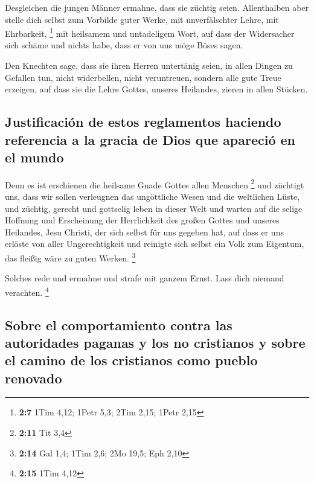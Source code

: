  Desgleichen die jungen Männer ermahne, dass sie züchtig
seien.  Allenthalben aber stelle dich selbst zum Vorbilde
guter Werke, mit unverfälschter Lehre, mit Ehrbarkeit, \footnote{\textbf{2:7}
  1Tim 4,12; 1Petr 5,3; 2Tim 2,15; 1Petr 2,15}  mit
heilsamem und untadeligem Wort, auf dass der Widersacher sich schäme und
nichts habe, dass er von uns möge Böses sagen.

 Den Knechten sage, dass sie ihren Herren untertänig
seien, in allen Dingen zu Gefallen tun, nicht widerbellen,
 nicht veruntreuen, sondern alle gute Treue erzeigen, auf
dass sie die Lehre Gottes, unseres Heilandes, zieren in allen Stücken.

\hypertarget{justificaciuxf3n-de-estos-reglamentos-haciendo-referencia-a-la-gracia-de-dios-que-apareciuxf3-en-el-mundo}{%
\subsection{Justificación de estos reglamentos haciendo referencia a la
gracia de Dios que apareció en el
mundo}\label{justificaciuxf3n-de-estos-reglamentos-haciendo-referencia-a-la-gracia-de-dios-que-apareciuxf3-en-el-mundo}}

 Denn es ist erschienen die heilsame Gnade Gottes allen
Menschen \footnote{\textbf{2:11} Tit 3,4}  und züchtigt
uns, dass wir sollen verleugnen das ungöttliche Wesen und die weltlichen
Lüste, und züchtig, gerecht und gottselig leben in dieser Welt
 und warten auf die selige Hoffnung und Erscheinung der
Herrlichkeit des großen Gottes und unseres Heilandes, Jesu Christi,
 der sich selbst für uns gegeben hat, auf dass er uns
erlöste von aller Ungerechtigkeit und reinigte sich selbst ein Volk zum
Eigentum, das fleißig wäre zu guten Werken. \footnote{\textbf{2:14} Gal
  1,4; 1Tim 2,6; 2Mo 19,5; Eph 2,10}

 Solches rede und ermahne und strafe mit ganzem Ernst.
Lass dich niemand verachten. \footnote{\textbf{2:15} 1Tim 4,12}

\hypertarget{sobre-el-comportamiento-contra-las-autoridades-paganas-y-los-no-cristianos-y-sobre-el-camino-de-los-cristianos-como-pueblo-renovado}{%
\subsection{Sobre el comportamiento contra las autoridades paganas y los
no cristianos y sobre el camino de los cristianos como pueblo
renovado}\label{sobre-el-comportamiento-contra-las-autoridades-paganas-y-los-no-cristianos-y-sobre-el-camino-de-los-cristianos-como-pueblo-renovado}}

